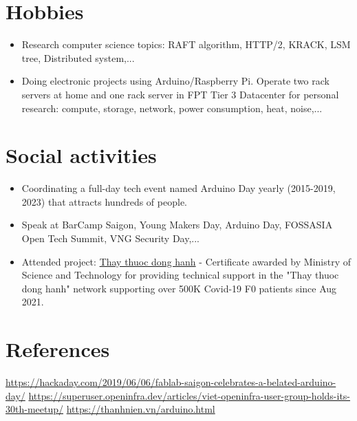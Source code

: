 \documentclass[letterpaper,11pt]{article}
\newcommand{\resumeItemNornal}[1]{
  \item\small{
    {#1 \vspace{-2pt}}
  }
}
\newcommand{\resumeSubItemNormal}[1]{\resumeItemNornal{#1}\vspace{-4pt}}
\newcommand{\resumeSubHeadingListStart}{\begin{itemize}[leftmargin=*]}
\newcommand{\resumeSubHeadingListEnd}{\end{itemize}}
\begin{document}
\section{Hobbies}
  \resumeSubHeadingListStart
    \resumeSubItemNormal
      {Research computer science topics: RAFT algorithm, HTTP/2, KRACK, LSM tree, Distributed system,...}
  \resumeSubItemNormal
      {Doing electronic projects using Arduino/Raspberry Pi. Operate two rack servers at home and one rack server in FPT Tier 3 Datacenter for personal research: compute, storage, network, power consumption, heat, noise,...}
\resumeSubHeadingListEnd

\section{Social activities}
  \resumeSubHeadingListStart
    \resumeSubItemNormal
      {Coordinating a full-day tech event named Arduino Day yearly (2015-2019, 2023) that attracts hundreds of people.}
    \resumeSubItemNormal
      {Speak at BarCamp Saigon, Young Makers Day, Arduino Day, FOSSASIA Open Tech Summit, VNG Security Day,...}
    \resumeSubItemNormal
      {Attended project: \href{https://thaythuocdonghanh.vn}{Thay thuoc dong hanh} - Certificate awarded by Ministry of Science and Technology for providing technical support in the "Thay thuoc dong hanh" network supporting over 500K Covid-19 F0 patients since Aug 2021.}
\resumeSubHeadingListEnd

\section{References}
    \small{\href{https://hackaday.com/2019/06/06/fablab-saigon-celebrates-a-belated-arduino-day/}{https://hackaday.com/2019/06/06/fablab-saigon-celebrates-a-belated-arduino-day/}}
    \small{\href{https://superuser.openinfra.dev/articles/viet-openinfra-user-group-holds-its-30th-meetup/}{https://superuser.openinfra.dev/articles/viet-openinfra-user-group-holds-its-30th-meetup/}}\newline
    \small{\href{https://thanhnien.vn/vi-sao-nhieu-nguoi-me-arduino-nen-tang-duoc-cho-la-tien-than-cua-giao-duc-stem-185230704165819482.htm}{https://thanhnien.vn/arduino.html}}
   
\end{document}
